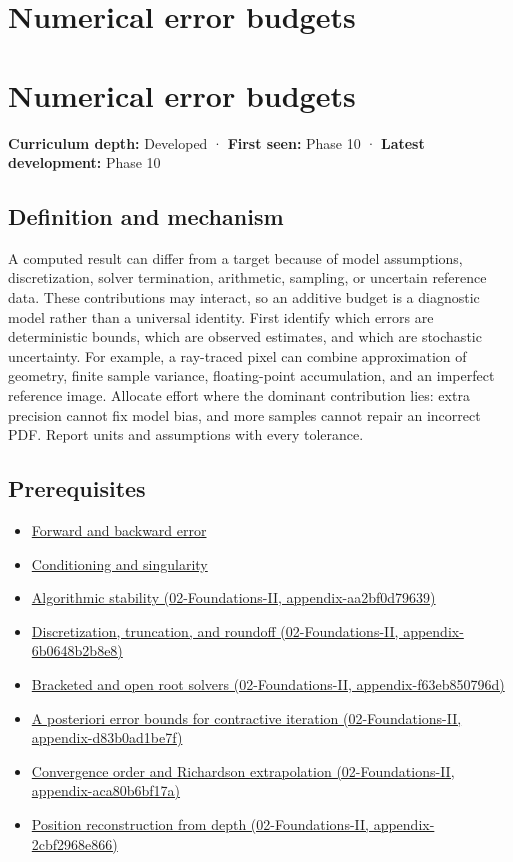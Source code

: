 \hypertarget{appendix-31b8c295e05f}{}
\section*{Numerical error budgets}
\section{Numerical error budgets}\label{numerical-error-budgets}

\textbf{Curriculum depth:} Developed · \textbf{First seen:} Phase 10 · \textbf{Latest development:} Phase 10

\subsection{Definition and mechanism}\label{definition-and-mechanism}

A computed result can differ from a target because of model assumptions, discretization, solver termination, arithmetic, sampling, or uncertain reference data. These contributions may interact, so an additive budget is a diagnostic model rather than a universal identity. First identify which errors are deterministic bounds, which are observed estimates, and which are stochastic uncertainty. For example, a ray-traced pixel can combine approximation of geometry, finite sample variance, floating-point accumulation, and an imperfect reference image. Allocate effort where the dominant contribution lies: extra precision cannot fix model bias, and more samples cannot repair an incorrect PDF. Report units and assumptions with every tolerance.

\subsection{Prerequisites}\label{prerequisites}

\begin{itemize}
\tightlist
\item
  \hyperref[appendix-a7fbaf6d1b1c]{Forward and backward error}
\item
  \hyperref[appendix-8f6a01f284a7]{Conditioning and singularity}
\item
  \href{}{Algorithmic stability (02-Foundations-II, appendix-aa2bf0d79639)}
\item
  \href{}{Discretization, truncation, and roundoff (02-Foundations-II, appendix-6b0648b2b8e8)}
\item
  \href{}{Bracketed and open root solvers (02-Foundations-II, appendix-f63eb850796d)}
\item
  \href{}{A posteriori error bounds for contractive iteration (02-Foundations-II, appendix-d83b0ad1be7f)}
\item
  \href{}{Convergence order and Richardson extrapolation (02-Foundations-II, appendix-aca80b6bf17a)}
\item
  \href{}{Position reconstruction from depth (02-Foundations-II, appendix-2cbf2968e866)}
\end{itemize}

